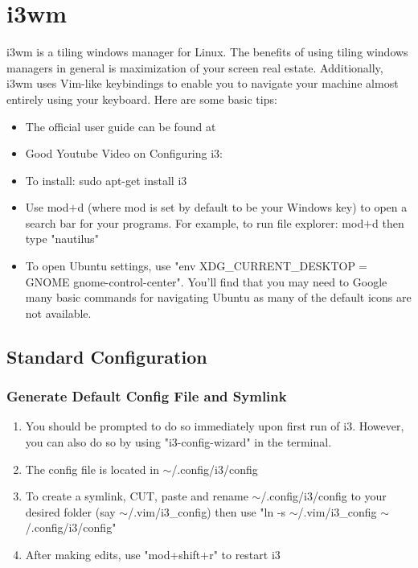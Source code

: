 \chapter{i3wm} \label{Chapi3wm}

i3wm is a tiling windows manager for Linux. The benefits of using tiling windows
managers in general is maximization of your screen real estate. Additionally,
i3wm uses Vim-like keybindings to enable you to navigate your machine almost
entirely using your keyboard. Here are some basic tips:
\begin{itemize}
    \item The official user guide can be found at \cite{stapelberg2015i3}
    \item Good Youtube Video on Configuring i3: \cite{codecast2015i3wm}
    \item To install: sudo apt-get install i3
    \item Use mod$+$d (where mod is set by default to be your Windows key) to open
        a search bar for your programs. For example, to run file explorer:
        mod$+$d then type "nautilus"
    \item To open Ubuntu settings, use "env XDG\_CURRENT\_DESKTOP$=$GNOME
        gnome-control-center". You'll find that you may need to Google many
        basic commands for navigating Ubuntu as many of the default icons are
        not available.
\end{itemize}

\section{Standard Configuration}
\subsection{Generate Default Config File and Symlink}
\begin{enumerate}
    \item You should be prompted to do so immediately upon first run of i3. However, you can also
        do so by using "i3-config-wizard" in the terminal.
    \item The config file is located in $\sim$/.config/i3/config
    \item To create a symlink, CUT, paste and rename $\sim$/.config/i3/config to your desired folder
        (say $\sim$/.vim/i3\_config)
        then use "ln -s $\sim$/.vim/i3\_config $\sim$/.config/i3/config"
    \item After making edits, use "mod+shift+r" to restart i3
\end{enumerate}

